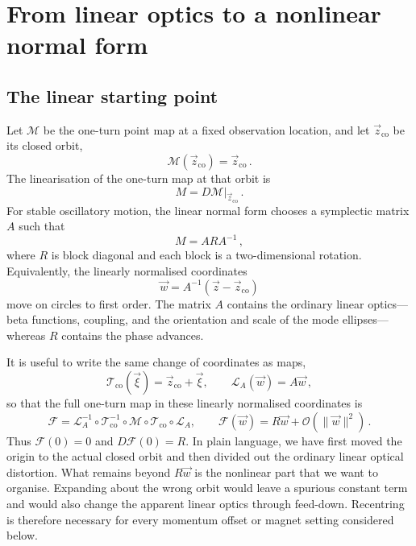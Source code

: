 \section{From linear optics to a nonlinear normal form}

\subsection{The linear starting point}

Let $\mathcal M$ be the one-turn point map at a fixed observation location,
and let $\vec z_{\mathrm{co}}$ be its closed orbit,
\begin{equation}
    \mathcal M(\vec z_{\mathrm{co}}) = \vec z_{\mathrm{co}}\,.
\end{equation}
The linearisation of the one-turn map at that orbit is
\begin{equation}
    M = \left.D\mathcal M\right|_{\vec z_{\mathrm{co}}}\,.
\end{equation}
For stable oscillatory motion, the linear normal form chooses a symplectic
matrix $A$ such that
\begin{equation}
    M = ARA^{-1}\,,
\end{equation}
where $R$ is block diagonal and each block is a two-dimensional rotation.
Equivalently, the linearly normalised coordinates
\begin{equation}
    \vec w = A^{-1}(\vec z - \vec z_{\mathrm{co}})
\end{equation}
move on circles to first order.  The matrix $A$ contains the ordinary linear
optics---beta functions, coupling, and the orientation and scale of the mode
ellipses---whereas $R$ contains the phase advances.

It is useful to write the same change of coordinates as maps,
\begin{equation}
    \mathcal T_{\mathrm{co}}(\vec\xi) = \vec z_{\mathrm{co}} + \vec\xi,
    \qquad \mathcal L_A(\vec w) = A\vec w\,,
\end{equation}
so that the full one-turn map in these linearly normalised coordinates is
\begin{equation}\label{eq:nnf-linear-normalisation}
    \mathcal F = \mathcal L_A^{-1}\circ\mathcal T_{\mathrm{co}}^{-1}
    \circ\mathcal M\circ\mathcal T_{\mathrm{co}}\circ\mathcal L_A,
    \qquad
    \mathcal F(\vec w) = R\vec w + \mathcal O(\|\vec w\|^2)\,.
\end{equation}
Thus $\mathcal F(0) = 0$ and $D\mathcal F(0) = R$.  In plain language, we have
first moved the origin to the actual closed orbit and then divided out the
ordinary linear optical distortion.  What remains beyond $R\vec w$ is the
nonlinear part that we want to organise.  Expanding about the wrong orbit
would leave a spurious constant term and would also change the apparent
linear optics through feed-down.  Recentring is therefore necessary for every
momentum offset or magnet setting considered below.


